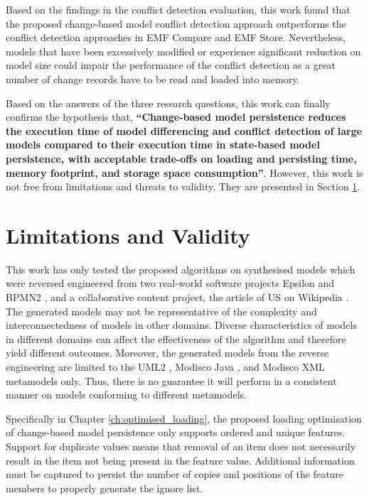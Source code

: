 \begin{enumerate}
Based on the findings in the conflict detection evaluation, this work found that the proposed change-based model conflict detection approach outperforms the conflict detection approaches in EMF Compare and EMF Store. Nevertheless, models that have been excessively modified or experience significant reduction on model size could impair the performance of the conflict detection as a great number of change records have to be read and loaded into memory.
  
\end{enumerate}

Based on the answers of the three research questions, this work can finally confirms the hypothesis that, 
\textbf{``Change-based model persistence reduces the execution time of model differencing and conflict detection of large models compared to their execution time in state-based model persistence, with acceptable trade-offs on loading and persisting time, memory footprint, and storage space consumption''}. However, this work is not free from limitations and threats to validity. They are presented in Section \ref{sec:limitation_and_Threat_to_validity}.

\section{Limitations and Validity}
\label{sec:limitation_and_Threat_to_validity}
This work has only tested the proposed algorithms on synthesised models which were reversed engineered from two real-world software projects Epsilon \cite{eclipse2018epsilongit} and BPMN2 \cite{eclipse2018bpmn2git}, and a collaborative content project, the article of US on Wikipedia \cite{wikipedia2018us}. The generated models may not be representative of the complexity and interconnectedness of models in other domains. Diverse characteristics of models in different domains can affect the effectiveness of the algorithm and therefore yield different outcomes. Moreover, the generated models from the reverse engineering are limited to the UML2 \cite{eclipse2017uml2}, Modisco Java \cite{eclipse2018modiscojava}, and Modisco XML \cite{eclipse2018modiscoxml} metamodels only. Thus, there is no guarantee it will perform in a consistent manner on models conforming to different metamodels.

Specifically in Chapter \ref{ch:optimised_loading}, the proposed loading optimisation of change-based model persistence only supports ordered and unique features. Support for duplicate values means that removal of an item does not necessarily result in the item not being present in the feature value. Additional information must be captured to persist the number of copies and positions of the feature members to properly generate the ignore list. 

